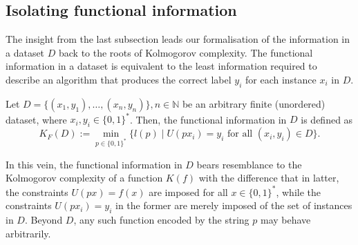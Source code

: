 \subsection{Isolating functional information}
The insight from the last subsection leads our formalisation of the information in a dataset $D$ back to the roots of Kolmogorov complexity.
The functional information in a dataset is equivalent to the least information required to describe an algorithm that produces the correct label $y_i$ for each instance $x_i$ in $D$.
\begin{definition}
	\label{def:functional-information}
	Let $D=\{(x_1,y_1),\dots,(x_n,y_n)\},n\in\mathbb{N}$ be an arbitrary finite (unordered) dataset, where $x_i,y_i\in\{0,1\}^{*}$.
	Then, the functional information in $D$ is defined as
	\begin{equation}
		K_{F}(D):=\min_{p\in\{0,1\}^{*}}\{l(p)\mid U(px_i)=y_i \text{ for all } (x_i,y_i)\in D\}.
	\end{equation}
\end{definition}
In this vein, the functional information in $D$ bears resemblance to the Kolmogorov complexity of a function $K(f)$ with the difference that in latter, the constraints $U(px)=f(x)$ are imposed for all $x\in\{0,1\}^{*}$, while the constraints $U(px_i)=y_i$ in the former are merely imposed of the set of instances in $D$. Beyond $D$, any such function encoded by the string $p$ may behave arbitrarily.

